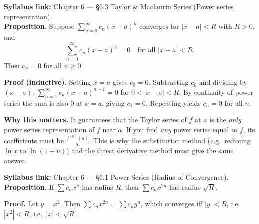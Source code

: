 \begin{extension}[title={Extension (Beyond Syllabus: uniqueness of power series coefficients)}]
\textbf{Syllabus link:} Chapter 6 --- \S6.3 Taylor \& Maclaurin Series (Power series representation).\\
\textbf{Proposition.} Suppose $\sum_{n=0}^{\infty} c_n (x-a)^n$ converges for $|x-a|<R$ with $R>0$, and
\[
\sum_{n=0}^{\infty} c_n (x-a)^n = 0 \quad \text{for all } |x-a|<R.
\]
Then $c_n=0$ for all $n\ge 0$.

\smallskip
\textbf{Proof (inductive).}
Setting $x=a$ gives $c_0=0$.
Subtracting $c_0$ and dividing by $(x-a)$: $\sum_{n=1}^{\infty}c_n(x-a)^{n-1}=0$ for $0<|x-a|<R$.
By continuity of power series the sum is also $0$ at $x=a$, giving $c_1=0$.
Repeating yields $c_n=0$ for all $n$.

\smallskip
\textbf{Why this matters.} It guarantees that the Taylor series of $f$ at $a$ is the \emph{only} power series representation of $f$ near $a$.
If you find \emph{any} power series equal to $f$, its coefficients must be $\frac{f^{(n)}(a)}{n!}$.
This is why the substitution method (e.g.\ reducing $\ln x$ to $\ln(1+u)$) and the direct derivative method must give the same answer.
\end{extension}

\begin{extension}[title={Extension (Beyond Syllabus: radius under $x\mapsto x^2$ --- Tutorial~11, Q3)}]
\textbf{Syllabus link:} Chapter 6 --- \S6.1 Power Series (Radius of Convergence).\smallskip\\
\textbf{Proposition.} If $\sum c_n x^n$ has radius $R$, then $\sum c_n x^{2n}$ has radius $\sqrt{R}$.

\smallskip
\textbf{Proof.}
Let $y=x^2$. Then $\sum c_n x^{2n}=\sum c_n y^n$, which converges iff $|y|<R$, i.e.\ $|x^2|<R$, i.e.\ $|x|<\sqrt{R}$.
\end{extension}

%
%
